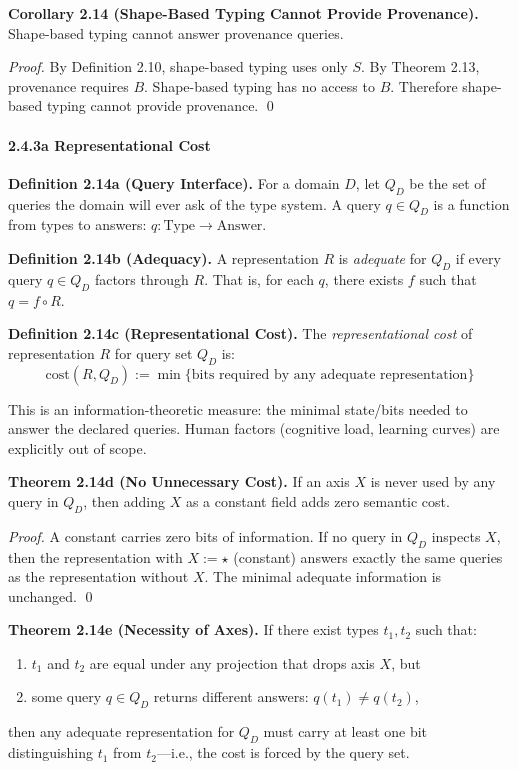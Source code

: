 \textbf{Corollary 2.14 (Shape-Based Typing Cannot Provide Provenance).}
Shape-based typing cannot answer provenance queries.

\emph{Proof.} By Definition 2.10, shape-based typing uses only \(S\). By
Theorem 2.13, provenance requires \(B\). Shape-based typing has no
access to \(B\). Therefore shape-based typing cannot provide provenance.
\qed

\paragraph{2.4.3a Representational Cost}\label{representational-cost}

\textbf{Definition 2.14a (Query Interface).} For a domain $D$, let $Q_D$ be the set of queries the domain will ever ask of the type system. A query $q \in Q_D$ is a function from types to answers: $q : \text{Type} \to \text{Answer}$.

\textbf{Definition 2.14b (Adequacy).} A representation $R$ is \emph{adequate} for $Q_D$ if every query $q \in Q_D$ factors through $R$. That is, for each $q$, there exists $f$ such that $q = f \circ R$.

\textbf{Definition 2.14c (Representational Cost).} The \emph{representational cost} of representation $R$ for query set $Q_D$ is:
\[\text{cost}(R, Q_D) := \min\{\text{bits required by any adequate representation}\}\]

This is an information-theoretic measure: the minimal state/bits needed to answer the declared queries. Human factors (cognitive load, learning curves) are explicitly out of scope.

\textbf{Theorem 2.14d (No Unnecessary Cost).} If an axis $X$ is never used by any query in $Q_D$, then adding $X$ as a constant field adds zero semantic cost.

\emph{Proof.} A constant carries zero bits of information. If no query in $Q_D$ inspects $X$, then the representation with $X := \star$ (constant) answers exactly the same queries as the representation without $X$. The minimal adequate information is unchanged. \qed

\textbf{Theorem 2.14e (Necessity of Axes).} If there exist types $t_1, t_2$ such that:
\begin{enumerate}
\item $t_1$ and $t_2$ are equal under any projection that drops axis $X$, but
\item some query $q \in Q_D$ returns different answers: $q(t_1) \neq q(t_2)$,
\end{enumerate}
then any adequate representation for $Q_D$ must carry at least one bit distinguishing $t_1$ from $t_2$---i.e., the cost is forced by the query set.

